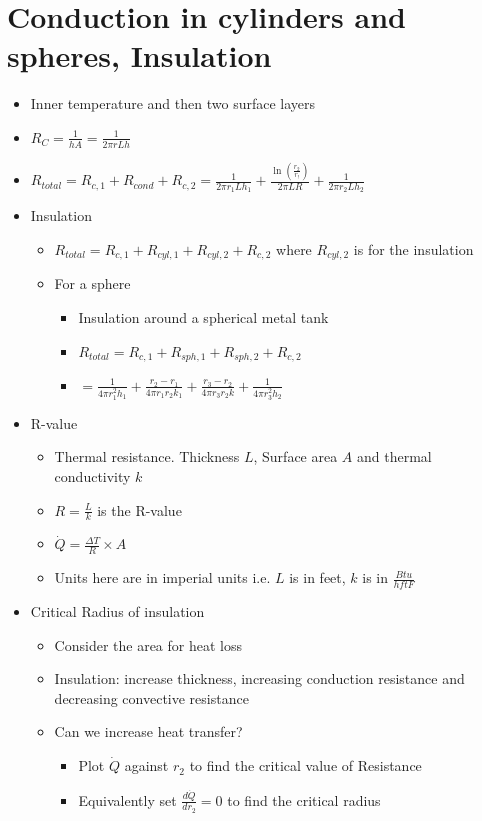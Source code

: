 \documentclass[12pt]{article}
\begin{document}
\section{Conduction in cylinders and spheres, Insulation}
\begin{itemize}
    \item Inner temperature and then two surface layers
    \item $R_C = \frac{1}{hA} = \frac{1}{2 \pi r L h}$
    \item $R_{total} = R_{c,1} + R_{cond} + R_{c,2} = \frac{1}{2 \pi r_1 L h_1} + \frac{\ln (\frac{r_2}{r_!})}{2 \pi L R} + \frac{1}{2 \pi r_2 L h_2}$
    \item Insulation \begin{itemize}
        \item $R_{total} = R_{c, 1} + R_{cyl, 1} + R_{cyl, 2} + R_{c, 2}$ where $R_{cyl, 2}$ is for the insulation
        \item For a sphere \begin{itemize}
            \item Insulation around a spherical metal tank 
            \item $R_{total} = R_{c,1} + R_{sph, 1} + R_{sph, 2} + R_{c,2}$
            \item $= \frac{1}{4 \pi r_1^2 h_1} + \frac{r_2-r_1}{4 \pi r_1 r_2 k_1} + \frac{r_3 - r_2}{4 \pi r_3 r_2 k} + \frac{1}{4 \pi r_3^2 h_2}$
        \end{itemize}
    \end{itemize}
    \item R-value \begin{itemize}
        \item Thermal resistance. Thickness $L$, Surface area $A$ and thermal conductivity $k$
        \item $R = \frac{L}{k}$ is the R-value
        \item $\dot{Q} = \frac{\Delta T}{R} \times A$
        \item Units here are in imperial units i.e. $L$ is in feet, $k$ is in $\frac{Btu}{h ft F}$
    \end{itemize}
    \item Critical Radius of insulation \begin{itemize}
        \item Consider the area for heat loss
        \item Insulation: increase thickness, increasing conduction resistance and decreasing convective resistance 
        \item Can we increase heat transfer? \begin{itemize}
            \item Plot $\dot{Q}$ against $r_2$ to find the critical value of Resistance
            \item Equivalently set $\frac{d\dot{Q}}{dr_2} = 0$ to find the critical radius
        \end{itemize}
    \end{itemize}
\end{itemize}
\end{document}
